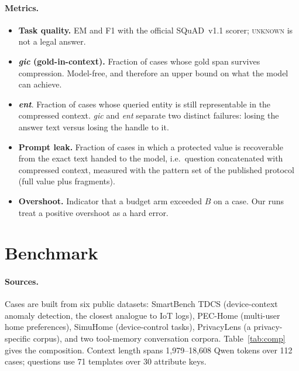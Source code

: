 \documentclass[conference]{IEEEtran}
\newcommand{\gic}{\emph{gic}}
\newcommand{\ent}{\emph{ent}}
\begin{document}
\paragraph{Metrics.}
\begin{itemize}
\item \textbf{Task quality.} EM and F1 with the official SQuAD~v1.1 scorer; \textsc{unknown} is
not a legal answer.
\item \textbf{\gic{} (gold-in-context).} Fraction of cases whose gold span survives
compression. Model-free, and therefore an upper bound on what the model can achieve.
\item \textbf{\ent{}}. Fraction of cases whose queried entity is still representable in the
compressed context. \gic{} and \ent{} separate two distinct failures: losing the answer text
versus losing the handle to it.
\item \textbf{Prompt leak.} Fraction of cases in which a protected value is recoverable from
the exact text handed to the model, i.e.\ question concatenated with compressed context,
measured with the pattern set of the published protocol (full value plus fragments).
\item \textbf{Overshoot.} Indicator that a budget arm exceeded $B$ on a case. Our runs treat a
positive overshoot as a hard error.
\end{itemize}

\section{Benchmark}
\label{sec:bench}

\paragraph{Sources.}
Cases are built from six public datasets: SmartBench TDCS (device-context anomaly detection,
the closest analogue to IoT logs), PEC-Home (multi-user home preferences), SimuHome
(device-control tasks), PrivacyLens (a privacy-specific corpus), and two tool-memory
conversation corpora. Table~\ref{tab:comp} gives the composition. Context length spans
1{,}979--18{,}608 Qwen tokens over 112 cases; questions use 71 templates over 30 attribute
keys.
\end{document}

